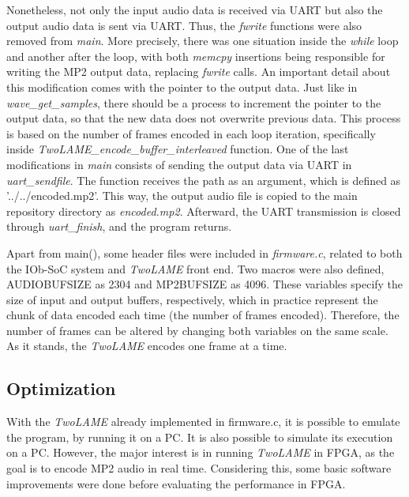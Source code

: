 Nonetheless, not only the input audio data is received via UART but also the output audio data is sent via UART. Thus, the \textit{fwrite} functions were also removed from \textit{main}.
More precisely, there was one situation inside the \textit{while} loop and another after the loop, with both \textit{memcpy} insertions being responsible for writing the MP2 output data, replacing \textit{fwrite} calls. An important detail about this modification comes with the pointer to the output data. Just like in \textit{wave\_get\_samples}, there should be a process to increment the pointer to the output data, so that the new data does not overwrite previous data. This process is based on the number of frames encoded in each loop iteration, specifically inside \textit{\textit{TwoLAME}\_encode\_buffer\_interleaved} function.
One of the last modifications in \textit{main} consists of sending the output data via UART in \textit{uart\_sendfile}. The function receives the path as an argument, which is defined as ’../../encoded.mp2’. This way, the output audio file is copied to the main repository directory as \textit{encoded.mp2}.
Afterward, the UART transmission is closed through \textit{uart\_finish}, and the program returns.

Apart from main(), some header files were included in \textit{firmware.c}, related to both the IOb-SoC system and \textit{TwoLAME} front end. Two macros were also defined, AUDIOBUFSIZE as 2304 and MP2BUFSIZE as 4096. These variables specify the size of input and output buffers, respectively, which in practice represent the chunk of data encoded each time (the number of frames encoded). Therefore, the number of frames can be altered by changing both variables on the same scale. As it stands, the \textit{TwoLAME} encodes one frame at a time.


\subsection{Optimization}

With the \textit{TwoLAME} already implemented in firmware.c, it is possible to emulate the program, by running it on a PC. It is also possible to simulate its execution on a PC. However, the major interest is in running \textit{TwoLAME} in FPGA, as the goal is to encode MP2 audio in real time. Considering this, some basic software improvements were done before evaluating the performance in FPGA.


